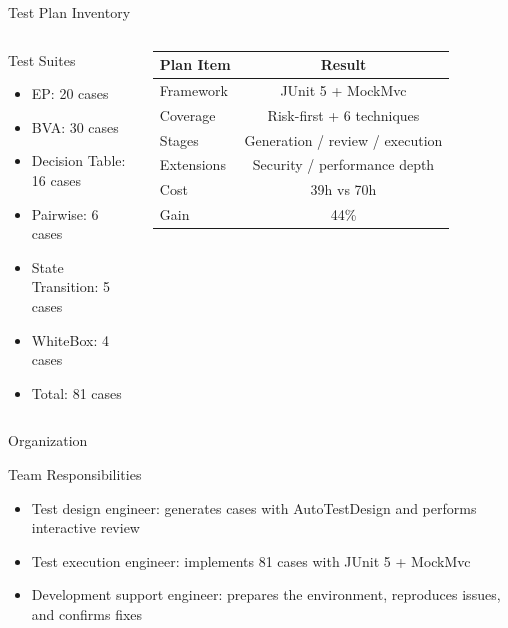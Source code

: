 \begin{frame}{Test Plan Inventory}
    \begin{columns}[T]
        \footnotesize
        \begin{block}{Test Suites}
            \begin{itemize}
                \item EP: 20 cases
                \item BVA: 30 cases
                \item Decision Table: 16 cases
                \item Pairwise: 6 cases
                \item State Transition: 5 cases
                \item WhiteBox: 4 cases
                \item Total: 81 cases
            \end{itemize}
        \end{block}

        \scriptsize
        \begin{tabular}{@{}lc@{}}
            \toprule
            \textbf{Plan Item} & \textbf{Result} \\ \midrule
            Framework & JUnit 5 + MockMvc \\
            Coverage & Risk-first + 6 techniques \\
            Stages & Generation / review / execution \\
            Extensions & Security / performance depth \\
            Cost & 39h vs 70h \\
            Gain & 44\% \\
            \bottomrule
        \end{tabular}
    \end{columns}
\end{frame}

\begin{frame}{Organization}
    \small
    \begin{block}{Team Responsibilities}
        \begin{itemize}
            \item Test design engineer: generates cases with AutoTestDesign and performs interactive review
            \item Test execution engineer: implements 81 cases with JUnit 5 + MockMvc
            \item Development support engineer: prepares the environment, reproduces issues, and confirms fixes
        \end{itemize}
    \end{block}
\end{frame}

